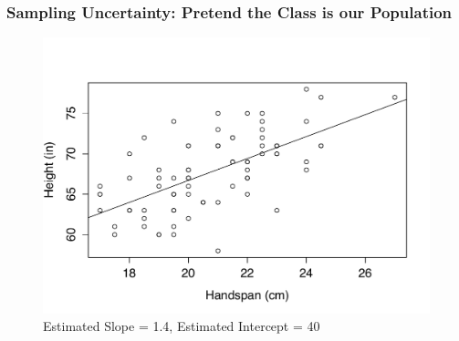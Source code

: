 \documentclass[handout]{beamer}
\begin{document}

\begin{frame}
\frametitle{Sampling Uncertainty: Pretend the Class is our Population}

\begin{figure}[h]
\centering
\includegraphics[scale = 0.5]{./images/height_handspan_reg}
\caption{Estimated Slope = 1.4, Estimated Intercept = 40}
\end{figure}


\end{frame}
\end{document}
